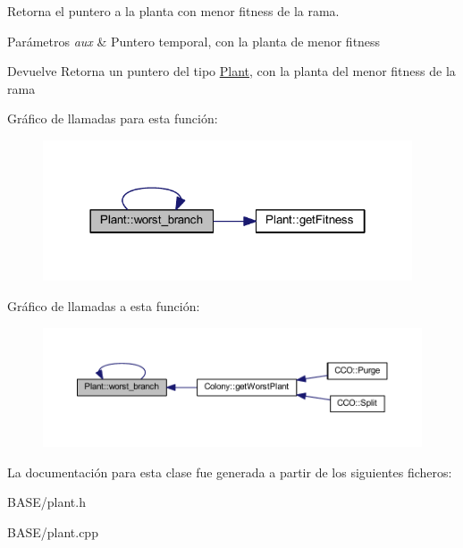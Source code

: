 Retorna el puntero a la planta con menor fitness de la rama. 


\begin{DoxyParams}{Parámetros}
{\em aux} & Puntero temporal, con la planta de menor fitness\\
\hline
\end{DoxyParams}
\begin{DoxyReturn}{Devuelve}
Retorna un puntero del tipo \hyperlink{class_plant}{Plant}, con la planta del menor fitness de la rama 
\end{DoxyReturn}


Gráfico de llamadas para esta función\+:
\nopagebreak
\begin{figure}[H]
\begin{center}
\leavevmode
\includegraphics[width=310pt]{class_plant_a0a576837260539510e8728af06d6d2cc_cgraph}
\end{center}
\end{figure}




Gráfico de llamadas a esta función\+:
\nopagebreak
\begin{figure}[H]
\begin{center}
\leavevmode
\includegraphics[width=350pt]{class_plant_a0a576837260539510e8728af06d6d2cc_icgraph}
\end{center}
\end{figure}




La documentación para esta clase fue generada a partir de los siguientes ficheros\+:\begin{DoxyCompactItemize}
\item 
B\+A\+S\+E/plant.\+h\item 
B\+A\+S\+E/plant.\+cpp\end{DoxyCompactItemize}
